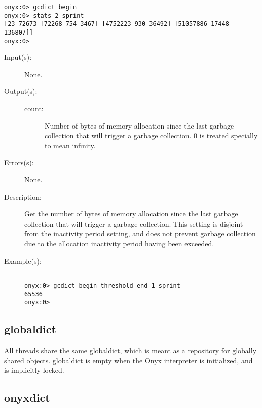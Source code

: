 \begin{description}
\begin{description}
\begin{verbatim}
onyx:0> gcdict begin
onyx:0> stats 2 sprint
[23 72673 [72268 754 3467] [4752223 930 36492] [51057886 17448 136807]]
onyx:0>
		\end{verbatim}
	\end{description}
\label{gcdict:threshold}
\item[{\onyxop{--}{threshold}{count}}: ]
	\begin{description}\item[]
	\item[Input(s): ] None.
	\item[Output(s): ]
		\begin{description}\item[]
		\item[count: ]
			Number of bytes of memory allocation since the last
			garbage collection that will trigger a garbage
			collection.  0 is treated specially to mean infinity.
		\end{description}
	\item[Errors(s): ] None.
	\item[Description: ]
		Get the number of bytes of memory allocation since the last
		garbage collection that will trigger a garbage collection.  This
		setting is disjoint from the inactivity period setting, and does
		not prevent garbage collection due to the allocation inactivity
		period having been exceeded.
	\item[Example(s): ]\begin{verbatim}

onyx:0> gcdict begin threshold end 1 sprint
65536
onyx:0>
		\end{verbatim}
	\end{description}
\end{description}

\subsection{globaldict}
\label{sec:globaldict}

All threads share the same globaldict, which is meant as a repository for
globally shared objects.  globaldict is empty when the Onyx interpreter is
initialized, and is implicitly locked.

\subsection{onyxdict}
\label{sec:onyxdict}


